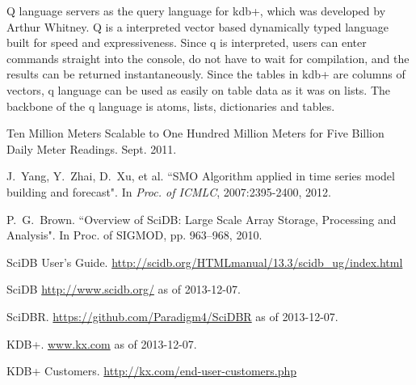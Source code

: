 \documentclass[a4paper,12pt]{llncs}
\begin{document}
Q language servers as the query language for kdb+, which was developed by Arthur Whitney.  Q is a interpreted vector based dynamically typed language  built for speed and expressiveness. Since q is interpreted, users can enter commands straight into the console, do not have to wait for compilation, and the results can be returned instantaneously. Since the tables in kdb+ are columns of vectors, q language can be used as easily on table data as it was on lists. The backbone of the q language is  atoms, lists, dictionaries and tables. 

 
\medskip
\begin{thebibliography}{1}

Ten Million Meters Scalable to One Hundred Million Meters for Five Billion Daily Meter Readings. Sept. 2011.

J.~Yang, Y.~Zhai, D.~Xu, et al. ``SMO Algorithm applied in
time series model building and forecast". In {\em Proc. of ICMLC}, 2007:2395-2400, 2012.

P.~G.~Brown.  ``Overview of SciDB: Large Scale Array Storage, Processing and Analysis". In Proc. of SIGMOD, pp. 963--968, 2010.

SciDB User's Guide. \url{http://scidb.org/HTMLmanual/13.3/scidb_ug/index.html}

SciDB \url{http://www.scidb.org/} as of 2013-12-07.

SciDBR. \url{https://github.com/Paradigm4/SciDBR} as of 2013-12-07.

KDB+.  \url{www.kx.com} as of 2013-12-07.

KDB+ Customers. \url{http://kx.com/end-user-customers.php}
\end{thebibliography}
\end{document}
